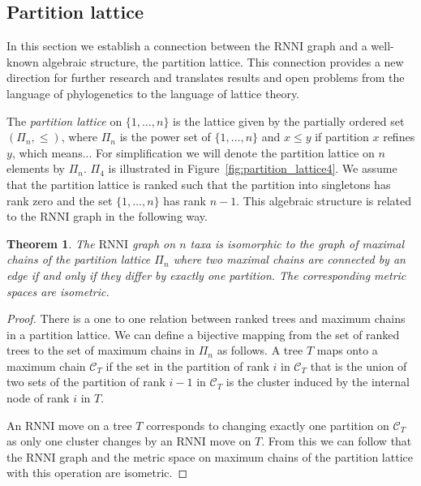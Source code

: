 \documentclass{amsart}
\newcommand{\rnni}{\mathrm{RNNI}}
\newtheorem{theorem}{Theorem}
\begin{document}
\subsection{Partition lattice}
\label{section:partition_lattice}

In this section we establish a connection between the $\rnni$ graph and a well-known algebraic structure, the partition lattice.
This connection provides a new direction for further research and translates results and open problems from the language of phylogenetics to the language of lattice theory.

The \emph{partition lattice} on $\{1, \ldots, n\}$ is the lattice given by the partially ordered set $(\Pi_n, \leq)$, where $\Pi_n$ is the power set of $\{1, \ldots, n\}$ and $x \leq y$ if partition $x$ refines $y$, which means...
For simplification we will denote the partition lattice on $n$ elements by $\Pi_n$.
$\Pi_4$ is illustrated in Figure~\ref{fig:partition_lattice4}.
We assume that the partition lattice is ranked such that the partition into singletons has rank zero and the set $\{1, \ldots, n\}$ has rank $n-1$.
This algebraic structure is related to the $\rnni$ graph in the following way.

\begin{theorem}
The $\rnni$ graph on $n$ taxa is isomorphic to the graph of maximal chains of the partition lattice $\Pi_n$ where two maximal chains are connected by an edge if and only if they differ by exactly one partition.
The corresponding metric spaces are isometric.
\end{theorem}

\begin{proof}
There is a one to one relation between ranked trees and maximum chains in a partition lattice.
We can define a bijective mapping from the set of ranked trees to the set of maximum chains in $\Pi_n$ as follows.
A tree $T$ maps onto a maximum chain $\mathcal{C}_T$ if the set in the partition of rank $i$ in $\mathcal{C}_T$ that is the union of two sets of the partition of rank $i-1$ in $\mathcal{C}_T$ is the cluster induced by the internal node of rank $i$ in $T$.

An $\rnni$ move on a tree $T$ corresponds to changing exactly one partition on $\mathcal{C}_T$ as only one cluster changes by an $\rnni$ move on $T$.
From this we can follow that the $\rnni$ graph and the metric space on maximum chains of the partition lattice with this operation are isometric.
\end{proof}
\end{document}
